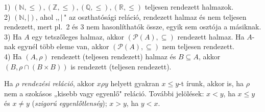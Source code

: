 \begin{example}
1) $(\mathbb{N},\leq),(\mathbb{Z},\leq),(\mathbb{Q},\leq),(\mathbb{R},\leq)$
teljesen rendezett halmazok.\\
 2) $(\mathbb{N},\mid)$, ahol ,,\,$\mid$\," az oszthatósági reláció,
rendezett halmaz és nem teljesen rendezett, mert pl.\ 2 és 3 nem
hasonlíthatók össze, egyik sem osztója a másiknak.\\
 3) Ha $A$ egy tetszőleges halmaz, akkor $(\mathcal{P}(A),\subseteq)$
rendezett halmaz. Ha $A$-nak egynél több eleme van, akkor $(\mathcal{P}(A),\subseteq)$
nem teljesen rendezett.\\
 4) Ha $(A,\rho)$ rendezett (teljesen rendezett) halmaz és $B\subseteq A$,
akkor $(B,\rho\cap(B\times B))$ is rendezett (teljesen rendezett). 
\end{example}

\smallskip{}

Ha $\rho$ \emph{rendezési reláció}, akkor $x\rho y$ helyett gyakran
$x\leq y$-t írunk, akkor is, ha $\rho$ nem a szokásos „kisebb vagy
egyenlő" reláció. További jelölések: $x<y$, ha $x\leq y$ és $x\neq y$
(\emph{szigorú egyenlőtlenség}); $x>y$, ha $y<x$.

\medskip{}

